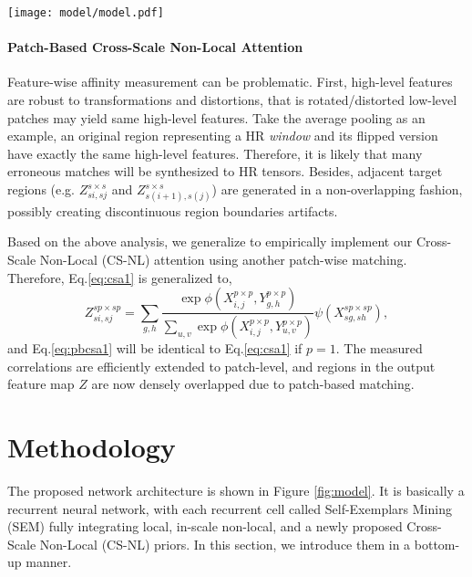 \documentclass[10pt,twocolumn,letterpaper]{article}
\begin{document}
\begin{figure*}
   \centering
		\texttt{[image: model/model.pdf]}
\caption{The recurrent architecture with the proposed Self-Exemplars Mining (SEM) cell. Inside SEM, it fuses features learned from a proposed Cross-Scale Non-Local (CS-NL) attention, with others from the In-Scale Non-Local (IS-NL) and the local paths.} 
    \label{fig:model}
\end{figure*}


\paragraph{Patch-Based Cross-Scale Non-Local Attention}
Feature-wise affinity measurement can be problematic. First, high-level features are robust to transformations and distortions, that is rotated/distorted low-level patches may yield same high-level features. Take the average pooling as an example, an original region representing a HR \textit{window} and its flipped version have exactly the same high-level features. Therefore, it is likely that many erroneous matches will be synthesized to HR tensors. Besides, adjacent target regions (e.g. $Z_{si,sj}^{s\times s}$ and $Z_{s(i+1),s(j)}^{s\times s}$) are generated in a non-overlapping fashion, possibly creating discontinuous region boundaries artifacts.   



Based on the above analysis, we generalize to empirically implement our Cross-Scale Non-Local (CS-NL) attention using another patch-wise matching. Therefore, Eq.\ref{eq:csa1} is generalized to,
\begin{equation}
    Z_{si, sj}^{sp \times sp} = \sum_{g, h}
    \frac{\exp{\phi(X_{i, j}^{p\times p}, Y_{g, h}^{p\times p})}}{\sum_{u, v}\exp{\phi(X_{i, j}^{p\times p}, Y_{u, v}^{p\times p})}}
    \psi(X_{sg, sh}^{sp \times sp}),
    \label{eq:pbcsa1}
\end{equation}
and Eq.\ref{eq:pbcsa1} will be identical to Eq.\ref{eq:csa1} if $p=1$. The measured correlations are efficiently extended to patch-level, and regions in the output feature map $Z$ are now densely overlapped due to patch-based matching. 


 \section{Methodology}

The proposed network architecture is shown in Figure \ref{fig:model}. It is basically a recurrent neural network, with each recurrent cell called Self-Exemplars Mining (SEM) fully integrating local, in-scale non-local, and a newly proposed Cross-Scale Non-Local (CS-NL) priors. In this section, we introduce them in a bottom-up manner.
\end{document}
